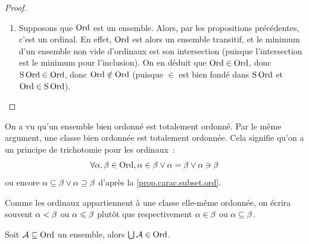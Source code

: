 \begin{proof}
\begin{enumerate}
\begin{itemize}
\begin{itemize}
        trouver un minimum dans un certain $\varOa \in \varFam$. Ce minimum est
        dans $\varPt$, donc dans $\bigcap \varFam$~: c'est donc bien un minimum
        au sens de $\in$ dans $\bigcap \varFam$.
      \end{itemize}
      Donc $\bigcap \varFam$ est un ordinal.
    \end{itemize}
  \item Supposons que $\operatorname{Ord}$ est un ensemble. Alors, par les propositions
    précédentes, c'est un ordinal. En effet, $\operatorname{Ord}$ est alors un ensemble
    transitif, et le minimum d'un ensemble non vide d'ordinaux est son
    intersection (puisque l'intersection est le minimum pour l'inclusion).
    On en déduit que $\operatorname{Ord}\in\operatorname{Ord}$, donc $\operatorname{S}\operatorname{Ord} \in \operatorname{Ord}$, donc
    $\operatorname{Ord}\notin\operatorname{Ord}$ (puisque $\in$ est bien fondé dans $\operatorname{S}\operatorname{Ord}$ et
    $\operatorname{Ord}\in\operatorname{S}\operatorname{Ord}$).\qedhere
  \end{enumerate}
\end{proof}

\begin{remark}
  On a vu qu'un ensemble bien ordonné est totalement ordonné. Par le même
  argument, une classe bien ordonnée est totalement ordonnée. Cela signifie
  qu'on a un principe de trichotomie pour les ordinaux~:
  \[\forall \alpha,\beta\in\operatorname{Ord}, \alpha\in \beta \lor \alpha = \beta \lor
  \alpha\ni\beta\]
  ou encore $\alpha\subseteq\beta \lor \alpha\supseteq\beta$ d'après la
  \cref{prop.carac.subset.ord}.
\end{remark}

\begin{notation}
  Comme les ordinaux appartiennent à une classe elle-même ordonnée, on écrira
  souvent $\alpha < \beta$ ou $\alpha \leqslant \beta$ plutôt que respectivement
  $\alpha \in \beta$ ou $\alpha \subseteq \beta$.
\end{notation}

\begin{property}
  Soit $\mathcal A\subseteq\operatorname{Ord}$ un ensemble, alors $\bigcup \mathcal A \in \operatorname{Ord}$.
\end{property}

